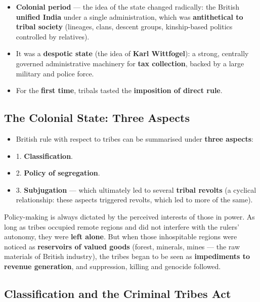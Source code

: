 \begin{KeyConcept}
\begin{itemize}
\item \textbf{Colonial period} --- the idea of the state changed radically: the British \textbf{unified India} under a single administration, which was \textbf{antithetical to tribal society} (lineages, clans, descent groups, kinship-based politics controlled by relatives).
\item It was a \textbf{despotic state} (the idea of \textbf{Karl Wittfogel}): a strong, centrally governed administrative machinery for \textbf{tax collection}, backed by a large military and police force.
\item For the \textbf{first time}, tribals tasted the \textbf{imposition of direct rule}.
\end{itemize}
\end{KeyConcept}

\subsection{The Colonial State: Three Aspects}

\begin{KeyConcept}
\begin{itemize}
\item British rule with respect to tribes can be summarised under \textbf{three aspects}:
\item 1. \textbf{Classification}.
\item 2. \textbf{Policy of segregation}.
\item 3. \textbf{Subjugation} --- which ultimately led to several \textbf{tribal revolts} (a cyclical relationship: these aspects triggered revolts, which led to more of the same).
\end{itemize}
\end{KeyConcept}

Policy-making is always dictated by the perceived interests of those in power. As long as tribes occupied remote regions and did not interfere with the rulers' autonomy, they were \textbf{left alone}. But when those inhospitable regions were noticed as \textbf{reservoirs of valued goods} (forest, minerals, mines --- the raw materials of British industry), the tribes began to be seen as \textbf{impediments to revenue generation}, and suppression, killing and genocide followed.

\subsection{Classification and the Criminal Tribes Act}

